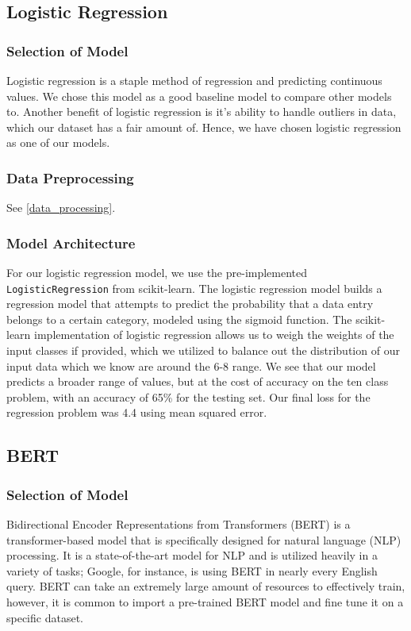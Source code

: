 \documentclass[11pt]{article}
\begin{document}
\subsection{Logistic Regression}
\subsubsection{Selection of Model}
Logistic regression is a staple method of regression and predicting continuous values.  We chose this model as a good baseline model to compare other models to.  Another benefit of logistic regression is it's ability to handle outliers in data, which our dataset has a fair amount of.  Hence, we have chosen logistic regression as one of our models.

\subsubsection{Data Preprocessing}
See \ref{data_processing}.

\subsubsection{Model Architecture}
For our logistic regression model, we use the pre-implemented \texttt{LogisticRegression} from scikit-learn.  The logistic regression model builds a regression model that attempts to predict the probability that a data entry belongs to a certain category, modeled using the sigmoid function.  The scikit-learn implementation of logistic regression allows us to weigh the weights of the input classes if provided, which we utilized to balance out the distribution of our input data which we know are around the 6-8 range.  We see that our model predicts a broader range of values, but at the cost of accuracy on the ten class problem, with an accuracy of 65\% for the testing set.  Our final loss for the regression problem was 4.4 using mean squared error.


\subsection{BERT}
\subsubsection{Selection of Model}
Bidirectional Encoder Representations from Transformers (BERT) is a transformer-based model that is specifically designed for natural language (NLP) processing.  It is a state-of-the-art model for NLP and is utilized heavily in a variety of tasks; Google, for instance, is using BERT in nearly every English query.  BERT can take an extremely large amount of resources to effectively train, however, it is common to import a pre-trained BERT model and fine tune it on a specific dataset.
\end{document}

